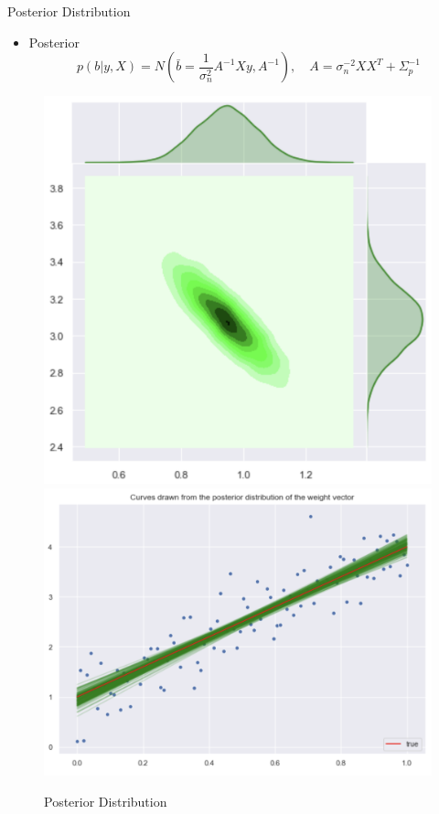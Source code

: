 \documentclass[10pt]{beamer}
\begin{document}
\begin{frame}{Posterior Distribution}{\cite[Chapter 2.1.1]{RW05}}
\begin{itemize}
\item Posterior 
$$
p(b|y, X) = N\left(\bar{b}=\frac{1}{\sigma_n^2}A^{-1}Xy, A^{-1}\right), \quad A=\sigma_{n}^{-2}XX^T + \Sigma_p^{-1}
$$
\end{itemize}
\begin{center}
\begin{figure}
\includegraphics[scale=0.17]{images/lin_join_posterior.png} 
\includegraphics[scale=0.17]{images/posterior_lin_mod_param_distr.png} 
\caption{Posterior Distribution}
\end{figure}
\end{center}
\end{frame}
\end{document}

